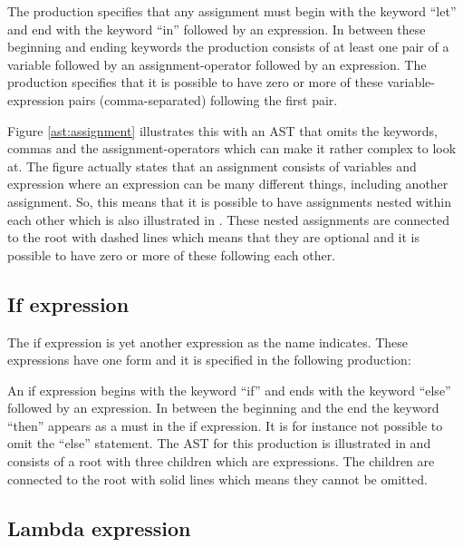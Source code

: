 The production specifies that any assignment must begin with the keyword ``let'' and end with the keyword ``in'' followed by an expression. In between these beginning and ending keywords the production consists of at least one pair of a variable followed by an assignment-operator followed by an expression. The production specifies that it is possible to have zero or more of these variable-expression pairs (comma-separated) following the first pair.%

%

Figure \ref{ast:assignment} illustrates this with an AST that omits the keywords, commas and the assignment-operators which can make it rather complex to look at. The figure actually states that an assignment consists of variables and expression where an expression can be many different things, including another assignment. So, this means that it is possible to have assignments nested within each other which is also illustrated in . These nested assignments are connected to the root with dashed lines which means that they are optional and it is possible to have zero or more of these following each other.%

\subsection{If expression}%

The if expression is yet another expression as the name indicates. These expressions have one form and it is specified in the following production:%

\begin{ebnf}%
%
\end{ebnf}%

An if expression begins with the keyword ``if'' and ends with the keyword ``else'' followed by an expression. In between the beginning and the end the keyword ``then'' appears as a must in the if expression. It is for instance not possible to omit the ``else'' statement. The AST for this production is illustrated in  and consists of a root with three children which are expressions. The children are connected to the root with solid lines which means they cannot be omitted.%

%

\subsection{Lambda expression}%

